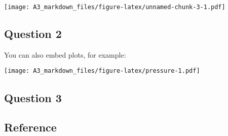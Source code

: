 \documentclass[
]{article}
\begin{document}
\texttt{[image: A3\_markdown\_files/figure-latex/unnamed-chunk-3-1.pdf]}

\subsection{Question 2}\label{question-2}

You can also embed plots, for example:

\texttt{[image: A3\_markdown\_files/figure-latex/pressure-1.pdf]}

\subsection{Question 3}\label{question-3}

\subsection{Reference}\label{reference}
\end{document}
